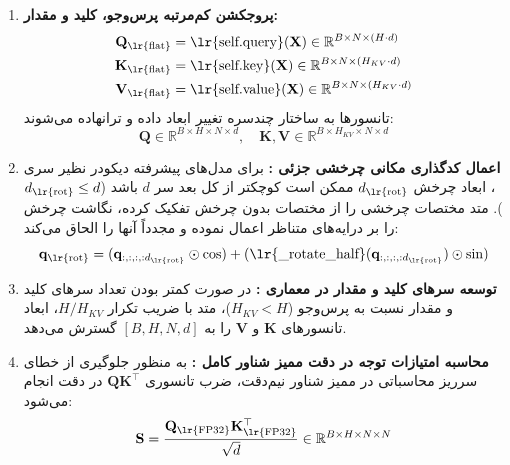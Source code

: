 \begin{enumerate}
    \item \textbf{پروجکشن کم‌مرتبه پرس‌وجو، کلید و مقدار:}
    \begin{align}
    \mathbf{Q}_{\text{\lr{flat}}} &= \text{\lr{self.query}}(\mathbf{X}) \in \mathbb{R}^{B \times N \times (H \cdot d)} \\
    \mathbf{K}_{\text{\lr{flat}}} &= \text{\lr{self.key}}(\mathbf{X}) \in \mathbb{R}^{B \times N \times (H_{KV} \cdot d)} \\
    \mathbf{V}_{\text{\lr{flat}}} &= \text{\lr{self.value}}(\mathbf{X}) \in \mathbb{R}^{B \times N \times (H_{KV} \cdot d)}
    \end{align}
    تانسورها به ساختار چندسره تغییر ابعاد داده و ترانهاده می‌شوند:
    \begin{equation}
    \mathbf{Q} \in \mathbb{R}^{B \times H \times N \times d}, \quad \mathbf{K}, \mathbf{V} \in \mathbb{R}^{B \times H_{KV} \times N \times d}
    \end{equation}
    \item \textbf{اعمال کدگذاری مکانی چرخشی جزئی :}
    برای مدل‌های پیشرفته دیکودر نظیر سری ، ابعاد چرخش $d_{\text{\lr{rot}}}$ ممکن است کوچکتر از کل بعد سر $d$ باشد ($d_{\text{\lr{rot}}} \le d$). متد  مختصات چرخشی را از مختصات بدون چرخش تفکیک کرده، نگاشت چرخش را بر درایه‌های متناظر اعمال نموده و مجدداً آنها را الحاق می‌کند:
    \begin{equation}
    \mathbf{q}_{\text{\lr{rot}}} = (\mathbf{q}_{:, :, :, :d_{\text{\lr{rot}}}} \odot \cos) + (\text{\lr{\_rotate\_half}}(\mathbf{q}_{:, :, :, :d_{\text{\lr{rot}}}}) \odot \sin)
    \end{equation}
    \item \textbf{توسعه سرهای کلید و مقدار در معماری :}
    در صورت کمتر بودن تعداد سرهای کلید و مقدار نسبت به پرس‌وجو ($H_{KV} < H$)، متد  با ضریب تکرار $H / H_{KV}$، ابعاد تانسورهای $\mathbf{K}$ و $\mathbf{V}$ را به $[B, H, N, d]$ گسترش می‌دهد.
    \item \textbf{محاسبه امتیازات توجه در دقت ممیز شناور کامل :}
    به منظور جلوگیری از خطای سرریز محاسباتی در ممیز شناور نیم‌دقت، ضرب تانسوری $\mathbf{Q} \mathbf{K}^\top$ در دقت  انجام می‌شود:
    \begin{equation}
    \mathbf{S} = \frac{\mathbf{Q}_{\text{\lr{FP32}}} \mathbf{K}_{\text{\lr{FP32}}}^\top}{\sqrt{d}} \in \mathbb{R}^{B \times H \times N \times N}
    \end{equation}

\end{enumerate}
